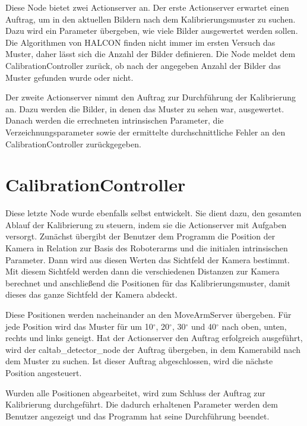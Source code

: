 Diese Node bietet zwei Actionserver an. Der erste Actionserver erwartet einen Auftrag, um in den aktuellen Bildern nach dem Kalibrierungsmuster zu suchen. Dazu wird ein Parameter übergeben, wie viele Bilder ausgewertet werden sollen. Die Algorithmen von HALCON finden nicht immer im ersten Versuch das Muster, daher lässt sich die Anzahl der Bilder definieren. Die Node meldet dem CalibrationController zurück, ob nach der angegeben Anzahl der Bilder das Muster gefunden wurde oder nicht.

Der zweite Actionserver nimmt den Auftrag zur Durchführung der Kalibrierung an. Dazu werden die Bilder, in denen das Muster zu sehen war, ausgewertet. Danach werden die errechneten intrinsischen Parameter, die Verzeichnungsparameter sowie der ermittelte durchschnittliche Fehler an den CalibrationController zurückgegeben.

\section{CalibrationController} %
\label{sec:calibrationcontroller}
Diese letzte Node wurde ebenfalls selbst entwickelt. Sie dient dazu, den gesamten Ablauf der Kalibrierung zu steuern, indem sie die Actionserver mit Aufgaben versorgt. Zunächst übergibt der Benutzer dem Programm die Position der Kamera in Relation zur Basis des Roboterarms und die initialen intrinsischen Parameter. Dann wird aus diesen Werten das Sichtfeld der Kamera bestimmt. Mit diesem Sichtfeld werden dann die verschiedenen Distanzen zur Kamera berechnet und anschließend die Positionen für das Kalibrierungsmuster, damit dieses das ganze Sichtfeld der Kamera abdeckt.

Diese Positionen werden nacheinander an den MoveArmServer übergeben. Für jede Position wird das Muster für um 10$^\circ$, 20$^\circ$, 30$^\circ$ und 40$^\circ$ nach oben, unten, rechts und links geneigt. Hat der Actionserver den Auftrag erfolgreich ausgeführt, wird der caltab\_detector\_node der Auftrag übergeben, in dem Kamerabild nach dem Muster zu suchen. Ist dieser Auftrag abgeschlossen, wird die nächste Position angesteuert.

Wurden alle Positionen abgearbeitet, wird zum Schluss der Auftrag zur Kalibrierung durchgeführt. Die dadurch erhaltenen Parameter werden dem Benutzer angezeigt und das Programm hat seine Durchführung beendet.